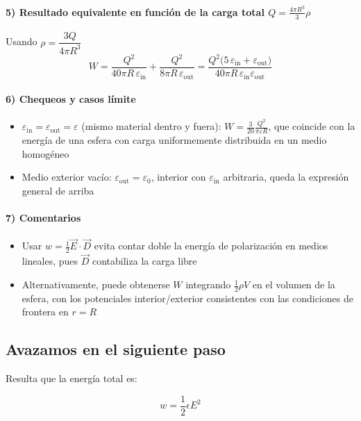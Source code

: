 \documentclass{article}
\begin{document}
\paragraph{5) Resultado equivalente en función de la carga total \(Q=\frac{4\pi R^{3}}{3}\rho\)}
Usando \(\rho=\dfrac{3Q}{4\pi R^{3}}\)
\[
\boxed{\,W
=\frac{Q^{2}}{40\pi R\,\varepsilon_{\text{in}}}
+\frac{Q^{2}}{8\pi R\,\varepsilon_{\text{out}}}
=\frac{Q^{2}\big(5\,\varepsilon_{\text{in}}+\varepsilon_{\text{out}}\big)}
{40\pi R\,\varepsilon_{\text{in}}\varepsilon_{\text{out}}}\,}
\]

\paragraph{6) Chequeos y casos límite}
\begin{itemize}
  \item \(\varepsilon_{\text{in}}=\varepsilon_{\text{out}}=\varepsilon\) (mismo material dentro y fuera): 
  \(\displaystyle W=\frac{3}{20}\frac{Q^{2}}{\pi\varepsilon R}\), que coincide con la energía de una esfera con carga uniformemente distribuida en un medio homogéneo
  \item Medio exterior vacío: \(\varepsilon_{\text{out}}=\varepsilon_{0}\), interior con \(\varepsilon_{\text{in}}\) arbitraria, queda la expresión general de arriba
\end{itemize}

\paragraph{7) Comentarios}
\begin{itemize}
  \item Usar \(w=\tfrac12 \vec E\cdot\vec D\) evita contar doble la energía de polarización en medios lineales, pues \(\vec D\) contabiliza la carga libre
  \item Alternativamente, puede obtenerse \(W\) integrando \(\tfrac12 \rho V\) en el volumen de la esfera, con los potenciales interior/exterior consistentes con las condiciones de frontera en \(r=R\)
\end{itemize}


\subsection{Avazamos en el siguiente paso}

Resulta que la energía total es:

\[ w =\frac{1}{2} \epsilon E^{2} \]
\end{document}
